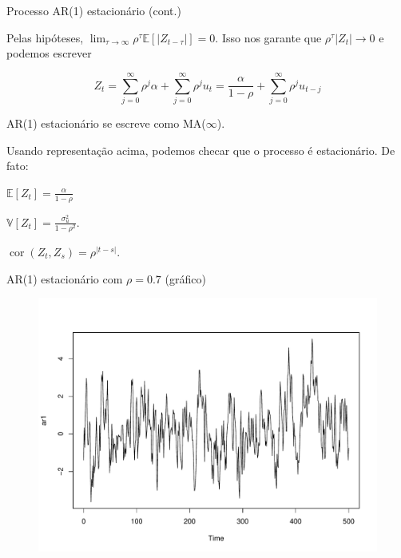 \documentclass[11pt]{beamer}
\newenvironment{halfwideitemize}{\itemize\addtolength{\itemsep}{0.5em}}{\enditemize}
\newenvironment{halfwideenumerate}{\enumerate\addtolength{\itemsep}{0.5em}}{\endenumerate}
\begin{document}
\begin{frame}{Processo AR(1) estacionário (cont.)}
	\begin{halfwideitemize}
		\item Pelas hipóteses, $\lim_{\tau \to \infty} \rho^{\tau} \mathbb{E}[|Z_{t-\tau}|] = 0$. Isso nos garante que $\rho^{\tau} |Z_t| \to 0$ e podemos escrever
		
		$$Z_t = \sum_{j=0}^{\infty} \rho^{j} \alpha +   \sum_{j=0}^{\infty } \rho^{j} u_t = \frac{\alpha}{1-\rho} + \sum_{j=0}^\infty \rho^j u_{t-j}$$
		\item AR(1) estacionário se escreve como MA($\infty$).
		\item Usando representação acima, podemos checar que o processo é estacionário. De fato:
			\begin{halfwideenumerate}
			\item $\mathbb{E}[Z_t] = \frac{\alpha}{1-\rho}$
			\item $\mathbb{V}[Z_t] = \frac{\sigma^2_u}{1-\rho^2}$.
			\item $\operatorname{cor}(Z_t, Z_s) = \rho^{|t-s|}$.
		\end{halfwideenumerate}
	\end{halfwideitemize}
\end{frame}

\begin{frame}{AR(1) estacionário com $\rho = 0.7$ (gráfico)}
	\begin{figure}
		\includegraphics[scale=0.5]{graficos/ar1.pdf}
	\end{figure}
\end{frame}
\end{document}
